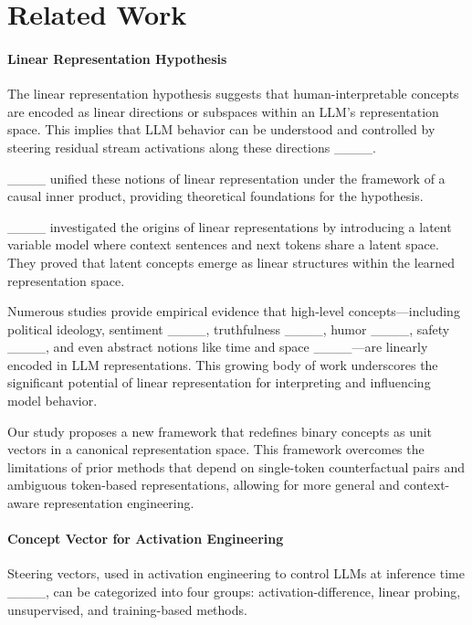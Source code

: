 \section{Related Work}
\paragraph{Linear Representation Hypothesis}
The linear representation hypothesis suggests that human-interpretable concepts are encoded as linear directions or subspaces within an LLM’s representation space. This implies that LLM behavior can be understood and controlled by steering residual stream activations along these directions ____.


____ unified these notions of linear representation under the framework of a causal inner product, providing theoretical foundations for the hypothesis. 

____ investigated the origins of linear representations by introducing a latent variable model where context sentences and next tokens share a latent space. They proved that latent concepts emerge as linear structures within the learned representation space. %

Numerous studies provide empirical evidence that high-level concepts—including political ideology, sentiment ____, truthfulness ____, humor ____, safety ____, and even abstract notions like time and space ____—are linearly encoded in LLM representations. This growing body of work underscores the significant potential of linear representation for interpreting and influencing model behavior. 

Our study proposes a new framework that redefines binary concepts as unit vectors in a canonical representation space. This framework overcomes the limitations of prior methods that depend on single-token counterfactual pairs and ambiguous token-based representations, allowing for more general and context-aware representation engineering.

\paragraph{Concept Vector for Activation Engineering}
\label{subsec:steering_activation_engineering}


Steering vectors, used in activation engineering to control LLMs at inference time ____, can be categorized into four groups: activation-difference, linear probing, unsupervised, and training-based methods.

